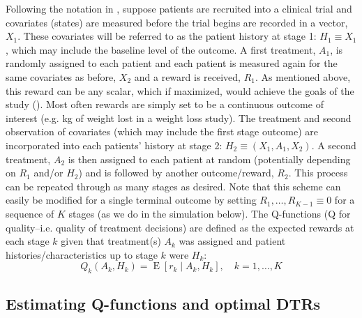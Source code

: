\documentclass[12pt]{article}
\begin{document}
Following the notation in \textcite{dtr-book}, suppose patients are recruited into a clinical trial and covariates (states) are measured before the trial begins are recorded in a vector, $X_{1}$. These covariates will be referred to as the patient history at stage 1: $H_{1} \equiv X_{1}$, which may include the baseline level of the outcome. A first treatment, $A_{1}$, is randomly assigned to each patient and each patient is measured again for the same covariates as before, $X_{2}$ and a reward is received, $R_{1}$. As mentioned above, this reward can be any scalar, which if maximized, would achieve the goals of the study (\cite{Sutton2016}). Most often rewards are simply set to be a continuous outcome of interest (e.g. kg of weight lost in a weight loss study). The treatment and second observation of covariates (which may include the first stage outcome) are incorporated into each patients' history at stage 2: $H_{2} \equiv (X_{1}, A_{1}, X_{2})$. A second treatment, $A_{2}$ is then assigned to each patient at random (potentially depending on $R_{1}$ and/or $H_{2}$) and is followed by another outcome/reward, $R_{2}$. This process can be repeated through as many stages as desired. Note that this scheme can easily be modified for a single terminal outcome by setting $R_{1}, \ldots, R_{K-1} \equiv 0$ for a sequence of $K$ stages (as we do in the simulation below). The Q-functions (Q for quality--i.e. quality of treatment decisions) are defined as the expected rewards at each stage $k$ given that treatment(s) $A_{k}$ was assigned and patient histories/characteristics up to stage $k$ were $H_{k}$:
\begin{equation}
   Q_{k}(A_{k}, H_{k})  = \operatorname{E}[r_{k} \mid A_{k}, H_{k}], \quad k = 1, \ldots, K
\end{equation}

%
%
%

\subsection{Estimating Q-functions and optimal DTRs} %
\label{sub:estimating_q_functions}
\end{document}
